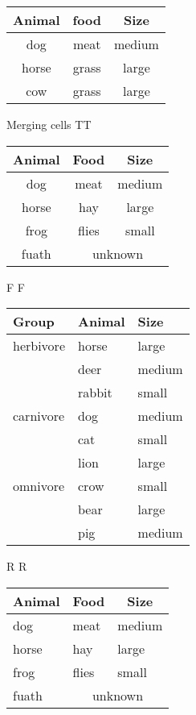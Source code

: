 \documentclass{article}
\begin{document}
\begin{tabular}{ccc} %
    \toprule 
    Animal & food & Size \\
    \midrule
    dog & meat & medium \\ 
    \cmidrule{1-1}
    \cmidrule(rl){2-2}
    horse & grass & large \\ 
    \cmidrule{2-3}
    cow & grass & large \\
    \bottomrule
\end{tabular}


Merging cells
TT

\begin{tabular}{ccc}
    \toprule
    Animal & Food  & Size   \\
    \midrule
    dog    & meat  & medium \\
    horse  & hay   & large  \\
    frog   & flies & small  \\
    fuath  & \multicolumn{2}{c}{unknown} \\
    \bottomrule
\end{tabular}

F
F

\begin{tabular}{lll}
  \toprule
  Group     & Animal & Size   \\
  \midrule
  herbivore & horse  & large  \\
            & deer   & medium \\
            & rabbit & small  \\
  \addlinespace
  carnivore & dog    & medium \\
            & cat    & small  \\
            & lion   & large  \\
  \addlinespace
  omnivore  & crow   & small  \\
            & bear   & large  \\
            & pig    & medium \\
  \bottomrule
\end{tabular}

R
R

\begin{tabular}{lll}
  \toprule
  \multicolumn{1}{c}{Animal} & \multicolumn{1}{c}{Food} & \multicolumn{1}{c}{Size} \\
  \midrule
  dog    & meat  & medium \\
  horse  & hay   & large  \\
  frog   & flies & small  \\
  fuath  & \multicolumn{2}{c}{unknown} \\
  \bottomrule
\end{tabular}
\end{document}
